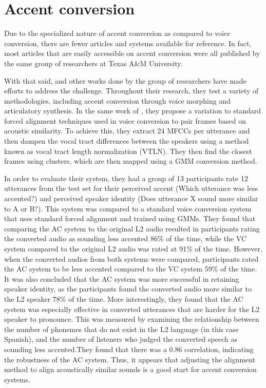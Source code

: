 \documentclass
[
    a4paper,
    twoside,
    12pt
]
{report}
\begin{document}
\section{Accent conversion}\label{accent-conversion}

Due to the specialized nature of accent conversion as compared to voice
conversion, there are fewer articles and systems available for
reference. In fact, most articles that are easily accessible on accent
conversion were all published by the same group of researchers at Texas
A\&M University.

With that said, \textcite{aryal2014} and other works done by the group
of researchers have made efforts to address the challenge. Throughout
their research, they test a variety of methodologies, including accent
conversion through voice morphing and articulatory synthesis. In the
same work of \textcite{aryal2014}, they propose a variation to standard
forced alignment techniques used in voice conversion to pair frames
based on acoustic similarity. To achieve this, they extract 24 MFCCs per
utterance and then dampen the vocal tract differences between the
speakers using a method known as vocal tract length normalization
(VTLN). They then find the closest frames using clusters, which are then
mapped using a GMM conversion method.

In order to evaluate their system, they had a group of 13 participants
rate 12 utterances from the test set for their perceived accent (Which
utterance was less accented?) and perceived speaker identity (Does
utterance X sound more similar to A or B?). This system was compared to
a standard voice conversion system that uses standard forced alignment
and trained using GMMs. They found that comparing the AC system to the
original L2 audio resulted in participants rating the converted audio as
sounding less accented 86\% of the time, while the VC system compared to
the original L2 audio was rated at 91\% of the time. However, when the
converted audios from both systems were compared, participants rated the
AC system to be less accented compared to the VC system 59\% of the
time. It was also concluded that the AC system was more successful in
retaining speaker identity, as the participants found the converted
audio more similar to the L2 speaker 78\% of the time. More
interestingly, they found that the AC system was especially effective in
converted utterances that are harder for the L2 speaker to pronounce.
This was measured by examining the relationship between the number of
phonemes that do not exist in the L2 language (in this case Spanish),
and the number of listeners who judged the converted speech as sounding
less accented.They found that there was a 0.86 correlation, indicating
the robustness of the AC system. Thus, it appears that adjusting the
alignment method to align acoustically similar sounds is a good start
for accent conversion systems.
\end{document}
